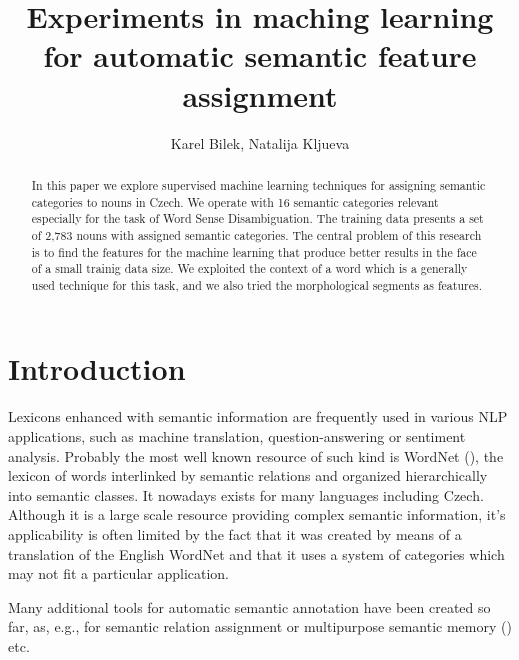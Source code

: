 \documentclass[letterpaper]{article}
\begin{document}
%

\title{Experiments in maching learning for automatic semantic feature assignment}
\author{Karel Bilek, Natalija Kljueva}
\maketitle
\begin{abstract}
In this paper we explore supervised machine learning techniques for
assigning semantic categories to nouns in Czech. We operate with 16 semantic categories 
relevant especially for the task of Word Sense Disambiguation. The training
data presents a set of 2,783 nouns with assigned semantic categories.   
The central problem of this research is to find the features for the machine learning 
that produce better results in the face of a small trainig data size. 
We exploited the context of a word which is a generally used technique for this task, 
and we also tried the morphological segments as features.

\end{abstract}


\section{Introduction}

Lexicons enhanced with semantic information are frequently used 
in various NLP applications, such as machine translation, question-answering
or sentiment analysis. Probably the most well known resource of such kind is 
WordNet (\cite{wordnet}), the lexicon of words
interlinked by semantic relations and organized hierarchically into 
semantic classes. It nowadays exists for many languages including Czech. Although it is a large scale resource providing complex semantic information, it's applicability is often limited by the fact that it was created by means of a translation of the English WordNet and that it uses a system of categories which may not fit a particular application.

Many additional tools for automatic semantic annotation have been created so far, as, e.g., 
for semantic relation assignment \cite{peirsman} or multipurpose semantic memory (\cite{baroni:2009}) etc.  
 
\end{document}
